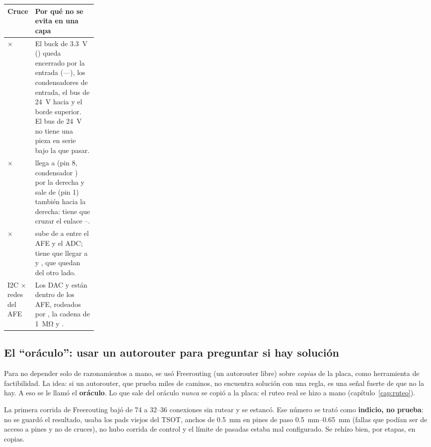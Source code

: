 \begin{center}
\begin{tabularx}{\linewidth}{@{}L{0.21\linewidth}Y@{}}
\toprule
\textbf{Cruce} & \textbf{Por qué no se evita en una capa} \\
\midrule
{} ×  & El buck de \SI{3.3}{\volt} () queda encerrado por la entrada
(----), los condensadores de entrada, el bus de \SI{24}{\volt} hacia  y el borde
superior. El bus de \SI{24}{\volt} no tiene una pieza en serie bajo la que pasar. \\
 ×  &  llega a  (pin 8, condensador ) por la derecha y
 sale de  (pin 1) también hacia la derecha: tiene que cruzar el enlace --. \\
 ×  &  sube de  a  entre el AFE y el ADC;  tiene que
llegar a  y , que quedan del otro lado. \\
I2C × redes del AFE & Los DAC  y  están dentro de los AFE, rodeados por , la cadena de
\SI{1}{\mega\ohm} y . \\
\bottomrule
\end{tabularx}
\end{center}

\subsection{El ``oráculo'': usar un autorouter para preguntar si hay solución}

Para no depender solo de razonamientos a mano, se usó Freerouting (un autorouter libre) sobre \emph{copias} de la
placa, como herramienta de factibilidad. La idea: si un autorouter, que prueba miles de caminos, no encuentra solución
con una regla, es una señal fuerte de que no la hay. A eso se le llamó el \textbf{oráculo}. Lo que sale del oráculo
\emph{nunca} se copió a la placa: el ruteo real se hizo a mano (capítulo~\ref{cap:ruteo}).

\begin{ojo}
La primera corrida de Freerouting bajó de 74 a 32--36 conexiones sin rutear y se estancó. Ese número se trató como
\textbf{indicio, no prueba}: no se guardó el resultado, usaba los pads viejos del TSOT, anchos de \SI{0.5}{\milli\meter}
en pines de paso \SIrange{0.5}{0.65}{\milli\meter} (fallas que podían ser de acceso a pines y no de cruces), no hubo
corrida de control y el límite de pasadas estaba mal configurado. Se rehízo bien, por etapas, en copias.
\end{ojo}

